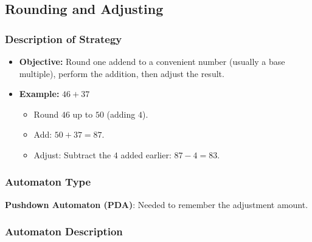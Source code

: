 \documentclass[11pt]{article}
\begin{document}
 
 
 
 
 

\subsection*{Rounding and Adjusting}

\subsubsection*{Description of Strategy}

\begin{itemize}
    \item \textbf{Objective:} Round one addend to a convenient number (usually a base multiple), perform the addition, then adjust the result.
    \item \textbf{Example:} $46 + 37$
    \begin{itemize}
        \item Round $46$ up to $50$ (adding $4$).
        \item Add: $50 + 37 = 87$.
        \item Adjust: Subtract the $4$ added earlier: $87 - 4 = 83$.
    \end{itemize}
\end{itemize}

\subsubsection*{Automaton Type}
\textbf{Pushdown Automaton (PDA)}: Needed to remember the adjustment amount.

\subsubsection*{Automaton Description}
\end{document}
